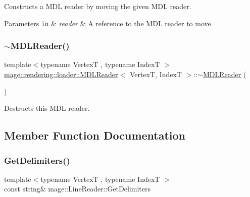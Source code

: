Constructs a M\+DL reader by moving the given M\+DL reader.


\begin{DoxyParams}[1]{Parameters}
\mbox{\tt in}  & {\em reader} & A reference to the M\+DL reader to move. \\
\hline
\end{DoxyParams}
\mbox{\label{classmage_1_1rendering_1_1loader_1_1_m_d_l_reader_a2f4c6bd8c2ef49180538ddfe5530e230}} 
\subsubsection{\texorpdfstring{$\sim$\+M\+D\+L\+Reader()}{~MDLReader()}}
{\footnotesize\ttfamily template$<$typename VertexT , typename IndexT $>$ \\
\mbox{\hyperlink{classmage_1_1rendering_1_1loader_1_1_m_d_l_reader}{mage\+::rendering\+::loader\+::\+M\+D\+L\+Reader}}$<$ VertexT, IndexT $>$\+::$\sim$\mbox{\hyperlink{classmage_1_1rendering_1_1loader_1_1_m_d_l_reader}{M\+D\+L\+Reader}} (\begin{DoxyParamCaption}{ }\end{DoxyParamCaption})}

Destructs this M\+DL reader. 

\subsection{Member Function Documentation}
\mbox{\label{classmage_1_1rendering_1_1loader_1_1_m_d_l_reader_aa00e1e27b614e11ec9f70e52d0bac551}} 
\subsubsection{\texorpdfstring{Get\+Delimiters()}{GetDelimiters()}}
{\footnotesize\ttfamily template$<$typename VertexT , typename IndexT $>$ \\
const string\& mage\+::\+Line\+Reader\+::\+Get\+Delimiters\hspace{0.3cm}{\ttfamily [noexcept]}}


